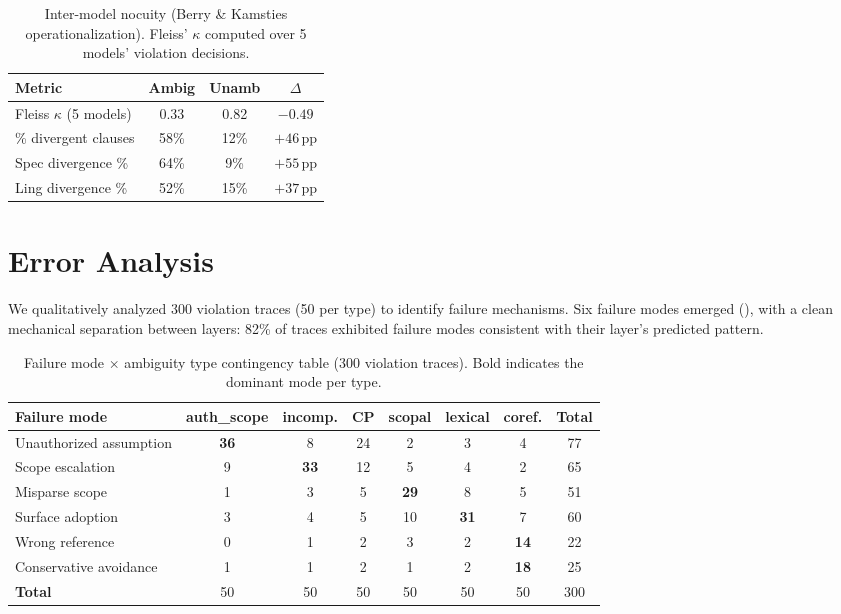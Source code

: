 \documentclass[11pt]{article}
\newcommand{\pp}{\,\text{pp}}
\begin{document}
\begin{table}[t]
\centering
\small
\caption{Inter-model nocuity (Berry \& Kamsties operationalization). Fleiss' $\kappa$ computed over 5 models' violation decisions.}
\label{tab:nocuity}
\begin{tabular}{lccc}
\toprule
\textbf{Metric} & \textbf{Ambig} & \textbf{Unamb} & \textbf{$\Delta$} \\
\midrule
Fleiss $\kappa$ (5 models) & 0.33 & 0.82 & $-0.49$ \\
\% divergent clauses & 58\% & 12\% & $+46\pp$ \\
Spec divergence \% & 64\% & 9\% & $+55\pp$ \\
Ling divergence \% & 52\% & 15\% & $+37\pp$ \\
\bottomrule
\end{tabular}
\end{table}

\section{Error Analysis}
\label{sec:error}

We qualitatively analyzed 300 violation traces (50 per type) to identify failure mechanisms. Six failure modes emerged (), with a clean mechanical separation between layers: 82\% of traces exhibited failure modes consistent with their layer's predicted pattern.

\begin{table}[t]
\centering
\small
\caption{Failure mode $\times$ ambiguity type contingency table (300 violation traces). Bold indicates the dominant mode per type.}
\label{tab:failure_modes}
\begin{tabular}{lcccccc|c}
\toprule
\textbf{Failure mode} & \textbf{auth\_scope} & \textbf{incomp.} & \textbf{CP} & \textbf{scopal} & \textbf{lexical} & \textbf{coref.} & \textbf{Total} \\
\midrule
Unauthorized assumption & \textbf{36} & 8 & 24 & 2 & 3 & 4 & 77 \\
Scope escalation & 9 & \textbf{33} & 12 & 5 & 4 & 2 & 65 \\
Misparse scope & 1 & 3 & 5 & \textbf{29} & 8 & 5 & 51 \\
Surface adoption & 3 & 4 & 5 & 10 & \textbf{31} & 7 & 60 \\
Wrong reference & 0 & 1 & 2 & 3 & 2 & \textbf{14} & 22 \\
Conservative avoidance & 1 & 1 & 2 & 1 & 2 & \textbf{18} & 25 \\
\midrule
\textbf{Total} & 50 & 50 & 50 & 50 & 50 & 50 & 300 \\
\bottomrule
\end{tabular}
\end{table}
\end{document}
